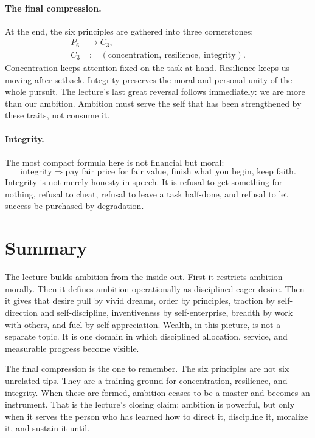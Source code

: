 \paragraph{The final compression.}
At the end, the six principles are gathered into three cornerstones:
\begin{align}
P_6 &\longrightarrow C_3, \\
C_3 &:= (\text{concentration},\ \text{resilience},\ \text{integrity}).
\end{align}
Concentration keeps attention fixed on the task at hand. Resilience keeps us moving after setback. Integrity preserves the moral and personal unity of the whole pursuit. The lecture's last great reversal follows immediately: we are more than our ambition. Ambition must serve the self that has been strengthened by these traits, not consume it.

\paragraph{Integrity.}
The most compact formula here is not financial but moral:
\begin{equation}
\text{integrity} \Rightarrow \text{pay fair price for fair value, finish what you begin, keep faith}.
\end{equation}
Integrity is not merely honesty in speech. It is refusal to get something for nothing, refusal to cheat, refusal to leave a task half-done, and refusal to let success be purchased by degradation.

\section{Summary}

The lecture builds ambition from the inside out. First it restricts ambition morally. Then it defines ambition operationally as disciplined eager desire. Then it gives that desire pull by vivid dreams, order by principles, traction by self-direction and self-discipline, inventiveness by self-enterprise, breadth by work with others, and fuel by self-appreciation. Wealth, in this picture, is not a separate topic. It is one domain in which disciplined allocation, service, and measurable progress become visible.

The final compression is the one to remember. The six principles are not six unrelated tips. They are a training ground for concentration, resilience, and integrity. When these are formed, ambition ceases to be a master and becomes an instrument. That is the lecture's closing claim: ambition is powerful, but only when it serves the person who has learned how to direct it, discipline it, moralize it, and sustain it until.